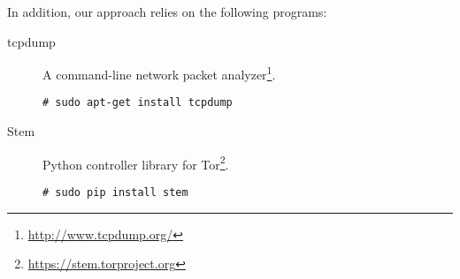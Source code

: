 
In addition, our approach relies on the following programs:
\begin{description}
\item[tcpdump] A command-line network packet analyzer\footnote{\url{http://www.tcpdump.org/}}. \vspace{-3mm} \begin{verbatim}# sudo apt-get install tcpdump\end{verbatim}
\item[Stem] Python controller library for Tor\footnote{\url{https://stem.torproject.org}}. \vspace{-3mm} \begin{verbatim}# sudo pip install stem\end{verbatim}


\end{description}
